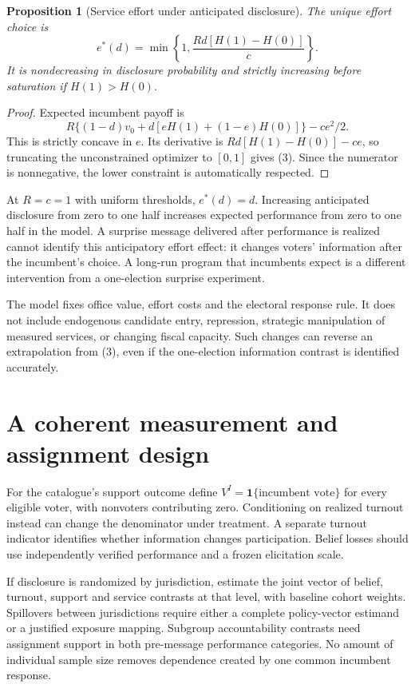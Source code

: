\documentclass[11pt,a4paper]{article}
\newtheorem{proposition}[theorem]{Proposition}
\newcommand{\ind}{\mathbf1}
\begin{document}
\begin{proposition}[Service effort under anticipated disclosure]
The unique effort choice is
\[
 e^*(d)=\min\left\{1,\frac{Rd[H(1)-H(0)]}{c}\right\}. \tag{3}
\]
It is nondecreasing in disclosure probability and strictly increasing before saturation if $H(1)>H(0)$.
\end{proposition}
\begin{proof}
Expected incumbent payoff is
\[
 R\{(1-d)v_0+d[eH(1)+(1-e)H(0)]\}-ce^2/2.
\]
This is strictly concave in $e$. Its derivative is $Rd[H(1)-H(0)]-ce$, so truncating the unconstrained optimizer to $[0,1]$ gives (3). Since the numerator is nonnegative, the lower constraint is automatically respected.
\end{proof}

At $R=c=1$ with uniform thresholds, $e^*(d)=d$. Increasing anticipated disclosure from zero to one half increases expected performance from zero to one half in the model. A surprise message delivered after performance is realized cannot identify this anticipatory effort effect: it changes voters' information after the incumbent's choice. A long-run program that incumbents expect is a different intervention from a one-election surprise experiment.

The model fixes office value, effort costs and the electoral response rule. It does not include endogenous candidate entry, repression, strategic manipulation of measured services, or changing fiscal capacity. Such changes can reverse an extrapolation from (3), even if the one-election information contrast is identified accurately.

\section{A coherent measurement and assignment design}
For the catalogue's support outcome define $V^I=\ind\{\text{incumbent vote}\}$ for every eligible voter, with nonvoters contributing zero. Conditioning on realized turnout instead can change the denominator under treatment. A separate turnout indicator identifies whether information changes participation. Belief losses should use independently verified performance and a frozen elicitation scale.

If disclosure is randomized by jurisdiction, estimate the joint vector of belief, turnout, support and service contrasts at that level, with baseline cohort weights. Spillovers between jurisdictions require either a complete policy-vector estimand or a justified exposure mapping. Subgroup accountability contrasts need assignment support in both pre-message performance categories. No amount of individual sample size removes dependence created by one common incumbent response.
\end{document}
